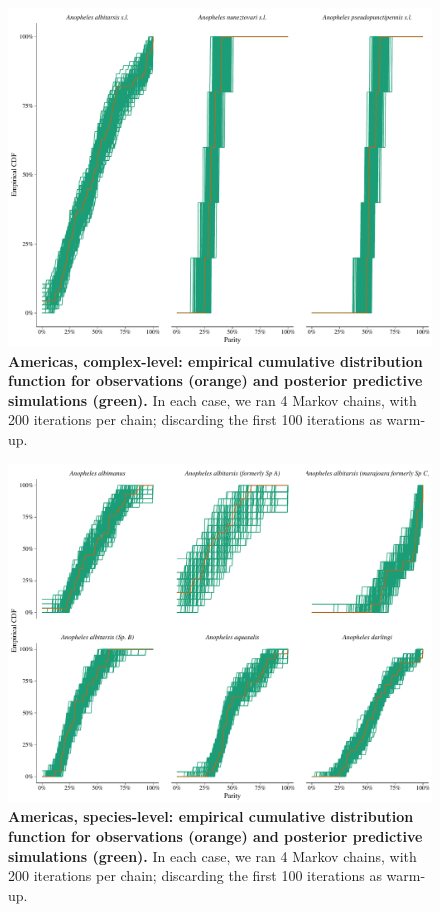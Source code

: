 \documentclass[12pt]{article}
\begin{document}
{\begin{figure}[ht]
	\centerline{\includegraphics[width=1\textwidth]{./Figure_files/detinova_ecdf_americas_grouped.pdf}}
	\caption{\textbf{Americas, complex-level: empirical cumulative distribution function for observations (orange) and posterior predictive simulations (green).} In each case, we ran 4 Markov chains, with 200 iterations per chain; discarding the first 100 iterations as warm-up.}\label{fig:detinova_ecdf_americas_grouped}
\end{figure}

\begin{figure}[ht]
	\centerline{\includegraphics[width=1\textwidth]{./Figure_files/detinova_ecdf_americas_species.pdf}}
	\caption{\textbf{Americas, species-level: empirical cumulative distribution function for observations (orange) and posterior predictive simulations (green).} In each case, we ran 4 Markov chains, with 200 iterations per chain; discarding the first 100 iterations as warm-up.}\label{fig:detinova_ecdf_americas_species}
\end{figure}

}
\end{document}

